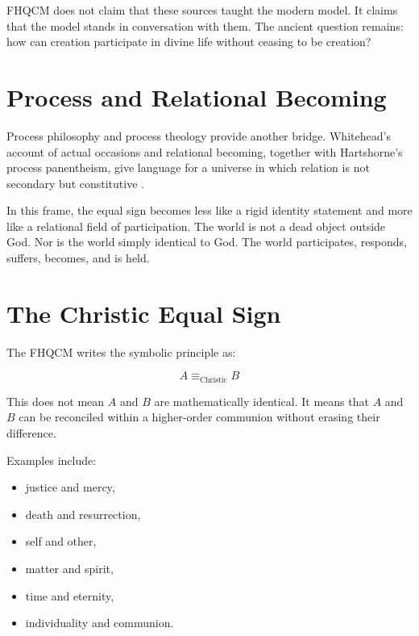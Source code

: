 FHQCM does not claim that these sources taught the modern model. It claims that the model stands in conversation with them. The ancient question remains: how can creation participate in divine life without ceasing to be creation?

\section{Process and Relational Becoming}

Process philosophy and process theology provide another bridge. Whitehead's account of actual occasions and relational becoming, together with Hartshorne's process panentheism, give language for a universe in which relation is not secondary but constitutive \cite{whitehead1929Process,hartshorne1948DivineRelativity}.

In this frame, the equal sign becomes less like a rigid identity statement and more like a relational field of participation. The world is not a dead object outside God. Nor is the world simply identical to God. The world participates, responds, suffers, becomes, and is held.

\section{The Christic Equal Sign}

The FHQCM writes the symbolic principle as:

\[
A \equiv_{\mathrm{Christic}} B
\]

This does not mean $A$ and $B$ are mathematically identical. It means that $A$ and $B$ can be reconciled within a higher-order communion without erasing their difference.

Examples include:

\begin{itemize}
\item justice and mercy,
\item death and resurrection,
\item self and other,
\item matter and spirit,
\item time and eternity,
\item individuality and communion.
\end{itemize}


